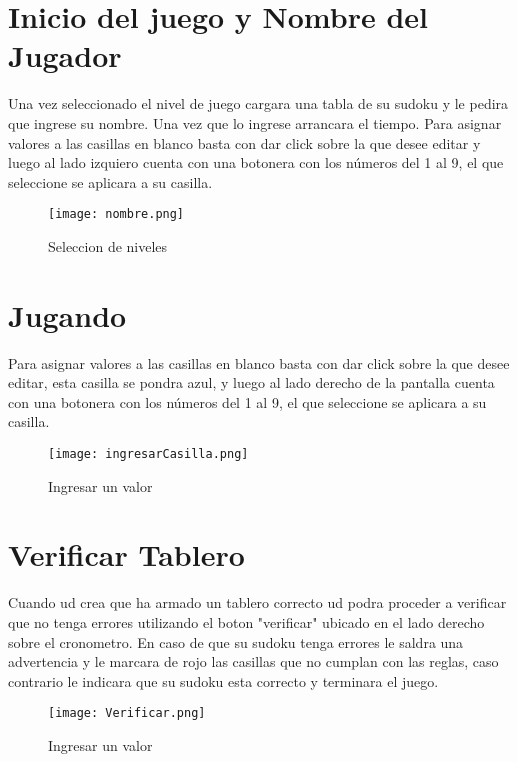 \documentclass[11pt,fleqn]{book} %
\begin{document}
\section{Inicio del juego y Nombre del Jugador}

Una vez seleccionado el nivel de juego cargara una tabla de su sudoku y le pedira que ingrese su nombre. Una vez que lo ingrese arrancara el tiempo.
Para asignar valores a las casillas en blanco basta con dar click sobre la que desee editar y luego al lado izquiero cuenta con una botonera con los números del 1 al 9, el que seleccione se aplicara a su casilla.

\begin{figure}[H]
\centering\texttt{[image: nombre.png]}
\caption{Seleccion de niveles}
\end{figure}

\section{Jugando}

Para asignar valores a las casillas en blanco basta con dar click sobre la que desee editar, esta casilla se pondra azul, y luego al lado derecho de la pantalla cuenta con una botonera con los números del 1 al 9, el que seleccione se aplicara a su casilla.

\begin{figure}[H]
\centering\texttt{[image: ingresarCasilla.png]}
\caption{Ingresar un valor}
\end{figure}

\section{Verificar Tablero}

Cuando ud crea que ha armado un tablero correcto ud podra proceder a verificar que no tenga errores utilizando el boton "verificar" ubicado en el lado derecho sobre el cronometro.
En caso de que su sudoku tenga errores le saldra una advertencia y le marcara de rojo las casillas que no cumplan con las reglas, caso contrario le indicara que su sudoku esta correcto y terminara el juego.

\begin{figure}[H]
\centering\texttt{[image: Verificar.png]}
\caption{Ingresar un valor}
\end{figure}
\end{document}
